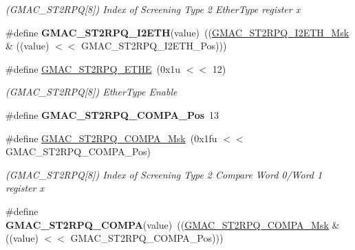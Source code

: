 \begin{DoxyCompactItemize}
\begin{DoxyCompactList}\small\item\em (G\+M\+A\+C\+\_\+\+S\+T2\+R\+PQ\mbox{[}8\mbox{]}) Index of Screening Type 2 Ether\+Type register x \end{DoxyCompactList}\item 
\mbox{\label{group__SAME70__GMAC_gaa39ab09027320e9f09bb66e14ef4a9b1}} 
\#define {\bfseries G\+M\+A\+C\+\_\+\+S\+T2\+R\+P\+Q\+\_\+\+I2\+E\+TH}(value)~((\mbox{\hyperlink{group__SAMV71__GMAC_gac6148f138674902973da48d5a22d826e}{G\+M\+A\+C\+\_\+\+S\+T2\+R\+P\+Q\+\_\+\+I2\+E\+T\+H\+\_\+\+Msk}} \& ((value) $<$$<$ G\+M\+A\+C\+\_\+\+S\+T2\+R\+P\+Q\+\_\+\+I2\+E\+T\+H\+\_\+\+Pos)))
\item 
\mbox{\label{group__SAME70__GMAC_gacc39d5722abf8582a18331f3c7bc502a}} 
\#define \mbox{\hyperlink{group__SAME70__GMAC_gacc39d5722abf8582a18331f3c7bc502a}{G\+M\+A\+C\+\_\+\+S\+T2\+R\+P\+Q\+\_\+\+E\+T\+HE}}~(0x1u $<$$<$ 12)
\begin{DoxyCompactList}\small\item\em (G\+M\+A\+C\+\_\+\+S\+T2\+R\+PQ\mbox{[}8\mbox{]}) Ether\+Type Enable \end{DoxyCompactList}\item 
\mbox{\label{group__SAME70__GMAC_gac008a6938b3013c6991b7f368a863e56}} 
\#define {\bfseries G\+M\+A\+C\+\_\+\+S\+T2\+R\+P\+Q\+\_\+\+C\+O\+M\+P\+A\+\_\+\+Pos}~13
\item 
\mbox{\label{group__SAME70__GMAC_gaf1659ef279185f80abed2bb4878dfa5d}} 
\#define \mbox{\hyperlink{group__SAME70__GMAC_gaf1659ef279185f80abed2bb4878dfa5d}{G\+M\+A\+C\+\_\+\+S\+T2\+R\+P\+Q\+\_\+\+C\+O\+M\+P\+A\+\_\+\+Msk}}~(0x1fu $<$$<$ G\+M\+A\+C\+\_\+\+S\+T2\+R\+P\+Q\+\_\+\+C\+O\+M\+P\+A\+\_\+\+Pos)
\begin{DoxyCompactList}\small\item\em (G\+M\+A\+C\+\_\+\+S\+T2\+R\+PQ\mbox{[}8\mbox{]}) Index of Screening Type 2 Compare Word 0/\+Word 1 register x \end{DoxyCompactList}\item 
\mbox{\label{group__SAME70__GMAC_ga4540628ba355496635af121eda84c023}} 
\#define {\bfseries G\+M\+A\+C\+\_\+\+S\+T2\+R\+P\+Q\+\_\+\+C\+O\+M\+PA}(value)~((\mbox{\hyperlink{group__SAMV71__GMAC_gaf1659ef279185f80abed2bb4878dfa5d}{G\+M\+A\+C\+\_\+\+S\+T2\+R\+P\+Q\+\_\+\+C\+O\+M\+P\+A\+\_\+\+Msk}} \& ((value) $<$$<$ G\+M\+A\+C\+\_\+\+S\+T2\+R\+P\+Q\+\_\+\+C\+O\+M\+P\+A\+\_\+\+Pos)))

\end{DoxyCompactItemize}

